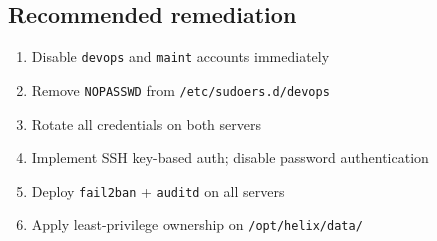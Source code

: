 \documentclass[a4paper, 12pt]{article}
\begin{document}
\subsection*{Recommended remediation}
\begin{enumerate}[leftmargin=2em]
  \item Disable \texttt{devops} and \texttt{maint} accounts immediately
  \item Remove \texttt{NOPASSWD} from \texttt{/etc/sudoers.d/devops}
  \item Rotate all credentials on both servers
  \item Implement SSH key-based auth; disable password authentication
  \item Deploy \texttt{fail2ban} + \texttt{auditd} on all servers
  \item Apply least-privilege ownership on \texttt{/opt/helix/data/}
\end{enumerate}
\end{document}
